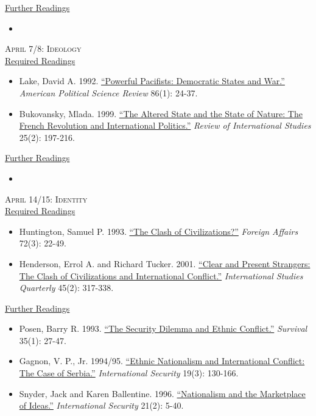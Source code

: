 \documentclass[11pt]{article}
\begin{document}
\noindent \underline{Further Readings}

\begin{itemize}
\item
\end{itemize}


\noindent \textsc{April 7/8: Ideology} \\

\noindent \underline{Required Readings}

\begin{itemize}
\item Lake, David A. 1992. \href{http://www.jstor.org/stable/1964013}{``Powerful Pacifists: Democratic States and War.''} \textit{American Political Science Review} 86(1): 24-37.
\item Bukovansky, Mlada. 1999. \href{http://www.jstor.org/stable/20097590}{``The Altered State and the State of Nature: The French Revolution and International Politics.''} \textit{Review of International Studies} 25(2): 197-216.
\end{itemize}

\noindent \underline{Further Readings}

\begin{itemize}
\item
\end{itemize}


\noindent \textsc{April 14/15: Identity} \\

\noindent \underline{Required Readings}

\begin{itemize}
\item Huntington, Samuel P. 1993. \href{http://www.jstor.org/stable/20045621}{``The Clash of Civilizations?''} \textit{Foreign Affairs} 72(3): 22-49.
\item Henderson, Errol A. and Richard Tucker. 2001. \href{http://www.jstor.org/stable/3096113}{``Clear and Present Strangers: The Clash of Civilizations and International Conflict.''} \textit{International Studies Quarterly} 45(2): 317-338.
\end{itemize}

\noindent \underline{Further Readings}

\begin{itemize}
\item Posen, Barry R. 1993. \href{http://www.tandfonline.com/doi/abs/10.1080/00396339308442672?journalCode=tsur20}{``The Security Dilemma and Ethnic Conflict.''} \textit{Survival} 35(1): 27-47.
\item Gagnon, V. P., Jr. 1994/95. \href{http://www.jstor.org/stable/2539081}{``Ethnic Nationalism and International Conflict: The Case of Serbia.''} \textit{International Security} 19(3): 130-166.
\item Snyder, Jack and Karen Ballentine. 1996. \href{http://www.jstor.org/stable/2539069}{``Nationalism and the Marketplace of Ideas.''} \textit{International Security} 21(2): 5-40.
\end{itemize}
\end{document}
